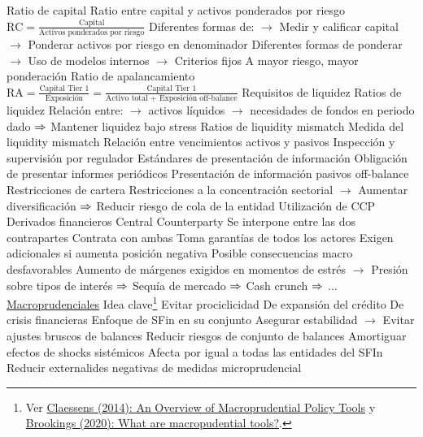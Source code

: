 \documentclass{nuevotema}
\begin{document}
\begin{esquemal}
				\4 Ratio de capital
				\4[] Ratio entre capital y activos ponderados por riesgo
				\4[] $\text{RC} = \frac{\text{Capital}}{\text{Activos ponderados por riesgo}}$
				\4[] Diferentes formas de:
				\4[] $\to$ Medir y calificar capital
				\4[] $\to$ Ponderar activos por riesgo en denominador
				\4[] Diferentes formas de ponderar
				\4[] $\to$ Uso de modelos internos
				\4[] $\to$ Criterios fijos
				\4[] A mayor riesgo, mayor ponderación
				\4 Ratio de apalancamiento
				\4[] $\text{RA} = \frac{\text{Capital Tier 1}}{\text{Exposición}} = \frac{\text{Capital Tier 1}}{\text{Activo total + Exposición off-balance}}$
			\3 Requisitos de liquidez
				\4 Ratios de liquidez
				\4[] Relación entre:
				\4[] $\to$ activos líquidos
				\4[] $\to$ necesidades de fondos en periodo dado
				\4[] $\Rightarrow$ Mantener liquidez bajo stress
				\4 Ratios de liquidity mismatch
				\4[] Medida del liquidity mismatch
				\4[] Relación entre vencimientos activos y pasivos
			\3 Inspección y supervisión por regulador
				\4 Estándares de presentación de información
				\4 Obligación de presentar informes periódicos
				\4 Presentación de información pasivos off-balance
			\3 Restricciones de cartera
				\4 Restricciones a la concentración sectorial
				\4[] $\to$ Aumentar diversificación
				\4[] $\Rightarrow$ Reducir riesgo de cola de la entidad
			\3 Utilización de CCP
				\4 Derivados financieros
				\4 Central Counterparty
				\4 Se interpone entre las dos contrapartes
				\4 Contrata con ambas
				\4 Toma garantías de todos los actores
				\4[] Exigen adicionales si aumenta posición negativa
				\4 Posible consecuencias macro desfavorables
				\4[] Aumento de márgenes exigidos en momentos de estrés
				\4[] $\to$ Presión sobre tipos de interés
				\4[] $\Rightarrow$ Sequía de mercado
				\4[] $\Rightarrow$ Cash crunch
				\4[] $\Rightarrow$ ...
			\3 \underline{Macroprudenciales}
			\3 Idea clave\footnote{Ver \href{https://www.imf.org/external/pubs/ft/wp/2014/wp14214.pdf}{Claessens (2014): An Overview of Macroprudential Policy Tools} y \href{https://www.brookings.edu/blog/up-front/2020/02/11/what-are-macroprudential-tools/\#cancel}{Brookings (2020): What are macropudential tools?}.}
				\4 Evitar prociclicidad
				\4[] De expansión del crédito
				\4[] De crisis financieras
				\4 Enfoque de SFin en su conjunto
				\4[] Asegurar estabilidad
				\4[] $\to$ Evitar ajustes bruscos de balances
				\4[] Reducir riesgos de conjunto de balances
				\4 Amortiguar efectos de shocks sistémicos
				\4[] Afecta por igual a todas las entidades del SFIn
				\4 Reducir externalides negativas de medidas microprudencial

\end{esquemal}
\end{document}
